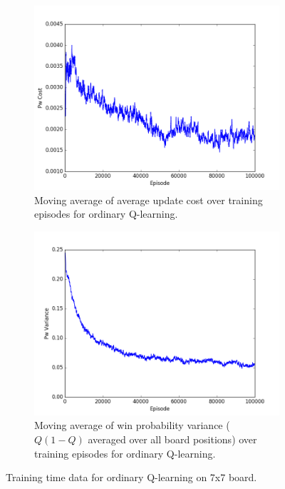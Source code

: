 \documentclass{article}
\begin{document}
\begin{figure}[!ht]
\centering
\begin{subfigure}[t]{.45\textwidth}
  \centering
      \includegraphics[width=1\textwidth]{pics/7x7_Q_Pw_cost.png}
  \caption{Moving average of average update cost over training episodes for ordinary Q-learning.}
  \label{fig:Q_cost}
\end{subfigure}\hfill
\begin{subfigure}[t]{.45\textwidth}
  \centering
      \includegraphics[width=1\textwidth]{pics/7x7_Q_Pw_var.png}
  \caption{Moving average of win probability variance ($Q(1-Q)$ averaged over all board positions) over training episodes for ordinary Q-learning.}
  \label{fig:Q_var}
\end{subfigure}
\caption{Training time data for ordinary Q-learning on 7x7 board.}
\label{fig:Q}
\end{figure}
\end{document}
